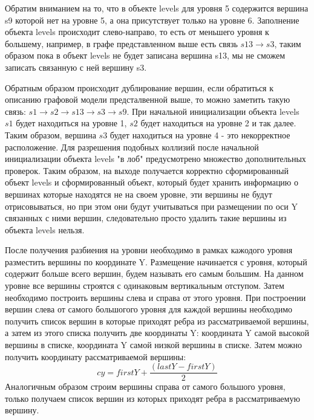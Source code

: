 Обратим вниманием на то, что в объекте levels для уровня 5 содержится вершина s9 которой нет на уровне 5, а она присутствует только на уровне 6. Заполнение объекта levels происходит слево-направо, то есть от меньшего уровня к большему, например, в графе представленном выше есть связь $s13 \rightarrow s3$, таким образом пока в объект levels не будет записана вершина s13, мы не сможем записать связанную с ней вершину s3.

Обратным образом происходит дублирование вершин, если обратиться к описанию графовой модели предсталвенной выше, то можно заметить такую связь: $s1 \rightarrow s2 \rightarrow s13 \rightarrow s3 \rightarrow s9$. При начальной инициализации объекта levels $s1$ будет находиться на уровне 1, $s2$ будет находиться на уровне 2 и так далее. Таким образом, вершина $s3$ будет находиться на уровне 4 - это некорректное расположение. Для разрешения подобных коллизий после начальной инициализации объекта levels "в лоб" предусмотрено множество дополнительных проверок. Таким образом, на выходе получается корректно сформированный объект levels и сформированный объект, который будет хранить информацию о вершинах которые находятся не на своем уровне, эти вершины не будут отрисовываться, но при этом они будут учитываться при размещении по оси Y связанных с ними вершин, следовательно просто удалить такие вершины из объекта levels нельзя.

После получения разбиения на уровни необходимо в рамках кажодого уровня разместить вершины по координате Y. Размещение начинается с уровня, который содержит больше всего вершин, будем называть его самым большим. На данном уровне все вершины строятся с одинаковым вертикальным отступом. Затем необходимо построить вершины слева и справа от этого уровня. При построении вершин слева от самого большогого уровня для каждой вершины необходимо получить список вершин в которые приходят ребра из рассматриваемой вершины, а затем из этого списка получить две координаты Y: координата Y самой высокой вершины в списке, координата Y самой низкой вершины в списке. Затем можно получить координату рассматриваемой вершины: $$cy = firstY + \frac{(lastY - firstY)}{2} $$ Аналогичным образом строим вершины справа от самого большого уровня, только получаем список вершин из которых приходят ребра в рассматриваемую вершину.

